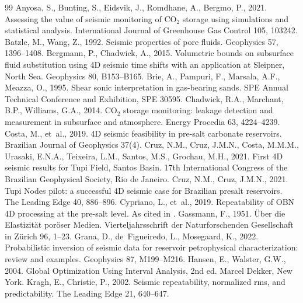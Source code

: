 \documentclass[preprint,11pt,authoryear]{elsarticle}
\begin{document}
\begin{thebibliography}{99}
 Anyosa, S., Bunting, S., Eidsvik, J., Romdhane, A., Bergmo, P., 2021. Assessing the value of seismic monitoring of CO$_2$ storage using simulations and statistical analysis. International Journal of Greenhouse Gas Control 105, 103242.
 Batzle, M., Wang, Z., 1992. Seismic properties of pore fluids. Geophysics 57, 1396--1408.
 Bergmann, P., Chadwick, A., 2015. Volumetric bounds on subsurface fluid substitution using 4D seismic time shifts with an application at Sleipner, North Sea. Geophysics 80, B153--B165.
 Brie, A., Pampuri, F., Marsala, A.F., Meazza, O., 1995. Shear sonic interpretation in gas-bearing sands. SPE Annual Technical Conference and Exhibition, SPE 30595.
 Chadwick, R.A., Marchant, B.P., Williams, G.A., 2014. CO$_2$ storage monitoring: leakage detection and measurement in subsurface and atmosphere. Energy Procedia 63, 4224--4239.
 Costa, M., et~al., 2019. 4D seismic feasibility in pre-salt carbonate reservoirs. Brazilian Journal of Geophysics 37(4).
 Cruz, N.M., Cruz, J.M.N., Costa, M.M.M., Urasaki, E.N.A., Teixeira, L.M., Santos, M.S., Grochau, M.H., 2021. First 4D seismic results for Tupi Field, Santos Basin. 17th International Congress of the Brazilian Geophysical Society, Rio de Janeiro.
 Cruz, N.M., Cruz, J.M.N., 2021. Tupi Nodes pilot: a successful 4D seismic case for Brazilian presalt reservoirs. The Leading Edge 40, 886--896.
 Cypriano, L., et~al., 2019. Repeatability of OBN 4D processing at the pre-salt level. As cited in \citet{cruz2021a}.
 Gassmann, F., 1951. \"Uber die Elastizit\"at por\"oser Medien. Vierteljahrsschrift der Naturforschenden Gesellschaft in Z\"urich 96, 1--23.
 Grana, D., de~Figueiredo, L., Mosegaard, K., 2022. Probabilistic inversion of seismic data for reservoir petrophysical characterization: review and examples. Geophysics 87, M199--M216.
 Hansen, E., Walster, G.W., 2004. Global Optimization Using Interval Analysis, 2nd ed. Marcel Dekker, New York.
 Kragh, E., Christie, P., 2002. Seismic repeatability, normalized rms, and predictability. The Leading Edge 21, 640--647.

\end{thebibliography}
\end{document}
